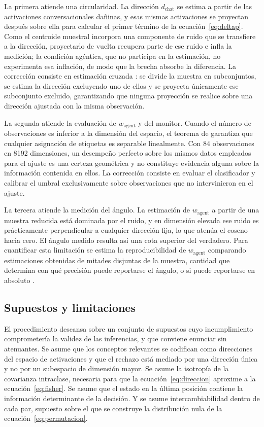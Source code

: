 La primera atiende una circularidad. La dirección $d_{\text{chat}}$ se estima a
partir de las activaciones conversacionales dañinas, y esas mismas activaciones
se proyectan después sobre ella para calcular el primer término de la
ecuación~\eqref{eq:deltap}. Como el centroide muestral incorpora una componente
de ruido que se transfiere a la dirección, proyectarlo de vuelta recupera parte
de ese ruido e infla la medición; la condición agéntica, que no participa en la
estimación, no experimenta esa inflación, de modo que la brecha absorbe la
diferencia. La corrección consiste en estimación cruzada
\parencite{chernozhukov2018}: se divide la muestra en subconjuntos, se estima
la dirección excluyendo uno de ellos y se proyecta únicamente ese subconjunto
excluido, garantizando que ninguna proyección se realice sobre una dirección
ajustada con la misma observación.

La segunda atiende la evaluación de $w_{\text{agent}}$ y del monitor. Cuando el
número de observaciones es inferior a la dimensión del espacio, el teorema de
\textcite{cover1965} garantiza que cualquier asignación de etiquetas es
separable linealmente. Con 84 observaciones en 8192 dimensiones, un desempeño
perfecto sobre los mismos datos empleados para el ajuste es una certeza
geométrica y no constituye evidencia alguna sobre la información contenida en
ellos. La corrección consiste en evaluar el clasificador y calibrar el umbral
exclusivamente sobre observaciones que no intervinieron en el ajuste.

La tercera atiende la medición del ángulo. La estimación de $w_{\text{agent}}$
a partir de una muestra reducida está dominada por el ruido, y en dimensión
elevada ese ruido es prácticamente perpendicular a cualquier dirección fija, lo
que atenúa el coseno hacia cero. El ángulo medido resulta así una cota superior
del verdadero. Para cuantificar esta limitación se estima la reproducibilidad
de $w_{\text{agent}}$ comparando estimaciones obtenidas de mitades disjuntas de
la muestra, cantidad que determina con qué precisión puede reportarse el ángulo,
o si puede reportarse en absoluto \parencite{spearman1904}.

\subsection{Supuestos y limitaciones}
\label{subsec:supuestos}

El procedimiento descansa sobre un conjunto de supuestos cuyo incumplimiento
comprometería la validez de las inferencias, y que conviene enunciar sin
atenuantes. Se asume que los conceptos relevantes se codifican como direcciones
del espacio de activaciones y que el rechazo está mediado por una dirección
única y no por un subespacio de dimensión mayor. Se asume la isotropía de la
covarianza intraclase, necesaria para que la ecuación~\eqref{eq:direccion}
aproxime a la ecuación~\eqref{eq:fisher}. Se asume que el estado en la última
posición contiene la información determinante de la decisión. Y se asume
intercambiabilidad dentro de cada par, supuesto sobre el que se construye la
distribución nula de la ecuación~\eqref{eq:permutacion}.

